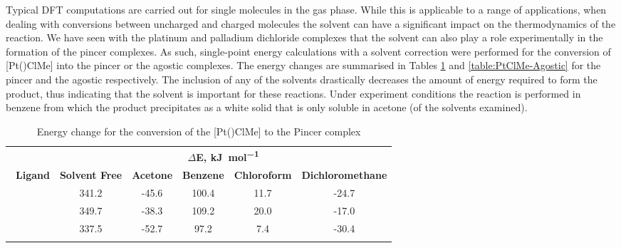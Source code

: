 Typical DFT computations are carried out for single molecules in the gas phase.  While this is applicable to a range of applications, when dealing with conversions between uncharged and charged molecules the solvent can have a significant impact on the thermodynamics of the reaction.  We have seen with the platinum and palladium dichloride complexes that the solvent can also play a role experimentally in the formation of the pincer complexes.  As such, single-point energy calculations with a solvent correction were performed for the conversion of [Pt(\tBuxantphos)ClMe] into the pincer or the agostic complexes.  The energy changes are summarised in Tables \ref{table:PtClMe-Pincer} and \ref{table:PtClMe-Agostic} for the pincer and the agostic respectively.  The inclusion of any of the solvents drastically decreases the amount of energy required to form the product, thus indicating that the solvent is important for these reactions.  Under experiment conditions the reaction is performed in benzene from which the product precipitates as a white solid that is only soluble in acetone (of the solvents examined).  

\begin{table}[htbp]
\caption[Energy change for the conversion of the [Pt(\tBuxantphos)ClMe{]} to the Pincer complex]{Energy change for the conversion of the [Pt(\tBuxantphos)ClMe{]} to the Pincer complex}
\vspace{1em}
\label{table:PtClMe-Pincer}
	\small
	\begin{center}
\begin{tabular}{l c c c c c}
	\toprule
	~ & \multicolumn{5}{c}{\bfseries{$\Delta$E, \si{\kilo\joule\per\mole}}} \\
	\cmidrule(lr){2-6} 
	~\bfseries{Ligand} & \bfseries{Solvent Free} & \bfseries{Acetone} &\bfseries{Benzene}&\bfseries{Chloroform} & \bfseries{Dichloromethane} \\
	\midrule		
	~\tBusixantphos 	& 341.2	& -45.6	& 100.4 	& 11.7	& -24.7\\
	~\tButhixantphos	& 349.7	& -38.3	& 109.2	& 20.0	& -17.0\\
	~\tBuxantphos		& 337.5	& -52.7	& 97.2	& 7.4		& -30.4\\
	\bottomrule{}
\end{tabular}
\end{center}
\end{table}

